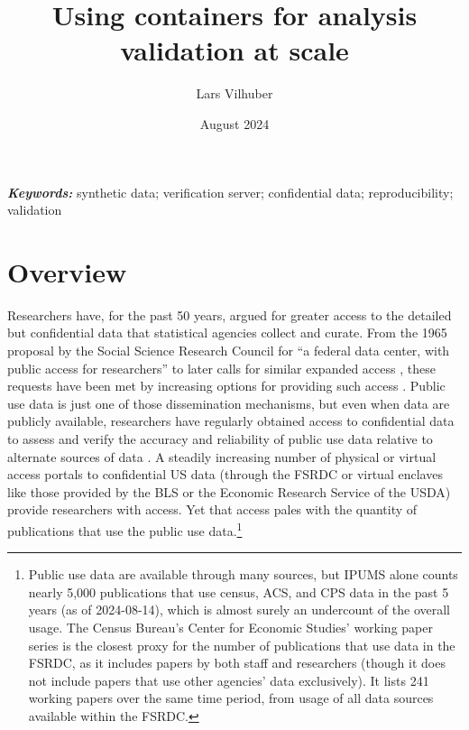 \documentclass[12pt]{article}
\title{Using containers for analysis validation at scale}
\author{Lars Vilhuber}
\date{August 2024}
\begin{document}
\maketitle

%

\vspace*{0.15in}
\hspace{10pt}
  \small	
  \textbf{\textit{Keywords: }} {synthetic data; verification server; confidential data; reproducibility; validation}
  
\section{Overview}
\label{sec:overview}

Researchers have, for the past 50 years, argued for greater access to the detailed but confidential data that statistical agencies collect and curate. From the 1965 proposal by the Social Science Research
Council for ``a federal data center, with public access for researchers'' \citep[pg. 219]{anderson_american_2015} to later calls for similar expanded access \citep[e.g.][]{card_expanding_2010}, these requests have been met by increasing options for providing such access \citep{united_nations_managing_2007,schouten_remote_2003,weinberg_access_2007,cole_handbook_2021}. Public use data is just one of those dissemination mechanisms, but even when data are publicly available, researchers have regularly obtained access to confidential data to assess and verify the accuracy and reliability of public use data relative to alternate sources of data \citep[to cite just a few, ][]{larrimore_consistent_2008,armour_using_2016,alexander_inaccurate_2010,abraham_exploring_2013,abraham_reconciling_2020}. A steadily increasing number of physical or virtual access portals to confidential US data (through the \ac{FSRDC} or virtual enclaves like those provided by the \ac{BLS} or the Economic Research Service of the USDA) provide researchers with access. Yet that access pales with the quantity of publications that use the public use data.\footnote{Public use data are available through many sources, but \ac{IPUMS} alone counts nearly 5,000 publications that use census, \ac{ACS}, and \ac{CPS} data in the past 5 years (as of 2024-08-14), which is almost surely an undercount of the overall usage. The Census Bureau's Center for Economic Studies' working paper series is the closest proxy for the number of publications that use data in the \ac{FSRDC}, as it includes papers by both staff and researchers (though it does not include papers that use other agencies' data exclusively). It lists 241 working papers over the same time period, from usage of all data sources available within the \ac{FSRDC}.} 
\end{document}
